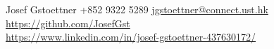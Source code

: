 \documentclass[grey]{hipstercv}
\newlength{\rightcolwidth}
\begin{document}
\begin{paracol}{2}









\vfill{} %

\setlength{\parindent}{0pt}
\begin{minipage}[t]{\rightcolwidth}
\begin{center}\fontfamily{\sfdefault}\selectfont \color{black!70}
{\small Josef Gstoettner  +852 9322 5289  \protect\url{jgstoettner@connect.ust.hk} \\ 
 \protect\url{https://github.com/JosefGst} \\ 
 \protect\url{https://www.linkedin.com/in/josef-gstoettner-437630172/} 
}
\end{center}
\end{minipage}


\end{paracol}
\end{document}
